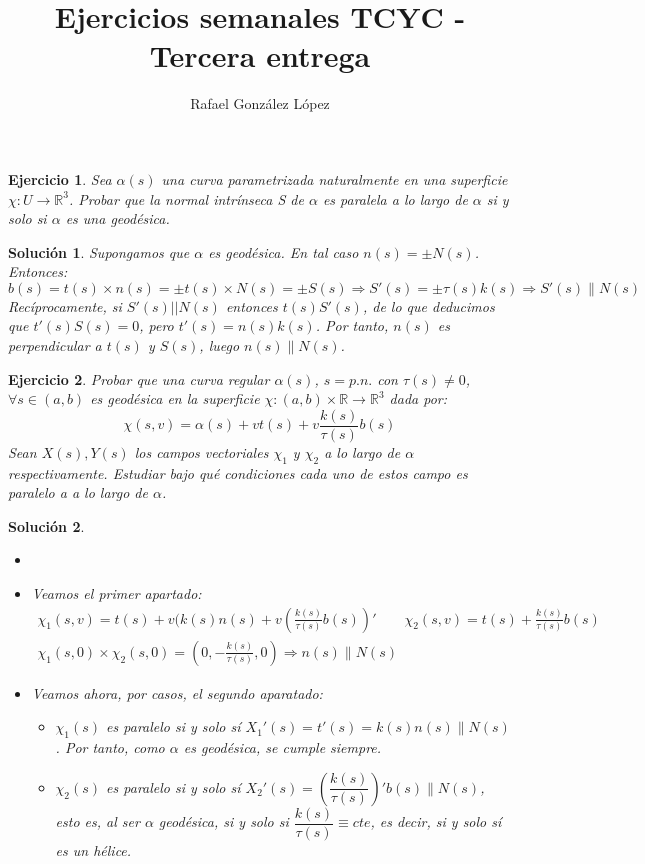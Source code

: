 \documentclass{article}
\theoremstyle{plain}
\newtheorem{exercise}{Ejercicio}
\newtheorem*{sol*}{Solución}
\newcommand{\R}{\mathbb{R}}
\newcommand{\X}{\chi}
\begin{document}
\title{Ejercicios semanales TCYC - Tercera entrega }
\author{Rafael González López}
\maketitle
\begin{exercise} Sea $\alpha(s)$ una curva parametrizada naturalmente en una superficie $\chi : U \rightarrow \R^3$. Probar
que la normal intrínseca S de $\alpha$ es paralela a lo largo de $\alpha$ si y solo si $\alpha$ es una geodésica.
\end{exercise}
\begin{sol*}
Supongamos que $\alpha$ es geodésica. En tal caso $n(s)=\pm N(s)$. Entonces:
\[
b(s) = t(s)\times n(s)= \pm t(s)\times N(s) = \pm S(s) \Rightarrow S'(s) = \pm \tau(s)k(s) \Rightarrow S'(s) \parallel N(s)
\]
Recíprocamente, si $S'(s)||N(s)$ entonces $t(s)S'(s)$, de lo que deducimos que $t'(s)S(s)=0$, pero $t'(s) = n(s)k(s)$. Por tanto, $n(s)$ es perpendicular a $t(s)$ y $S(s)$, luego $n(s)\parallel N(s)$.
\end{sol*}


\newpage
\begin{exercise}Probar que una curva regular $\alpha(s)$, $s=p.n.$ con $\tau(s)\neq 0$, $\forall s\in (a,b)$ es geodésica en la superficie $\X:(a,b)\times\R \rightarrow\R^3$ dada por:
\[
\X(s,v)=\alpha(s)+v t(s) + v\frac{k(s)}{\tau(s)}b(s)
\]
Sean $X(s),Y(s)$ los campos vectoriales $\X_1$ y $\X_2$ a lo largo de $\alpha$ respectivamente. Estudiar bajo qué condiciones cada uno de estos campo es paralelo a a lo largo de $\alpha$.
\end{exercise}
\begin{sol*}
\begin{itemize}
\item[]
\item Veamos el primer apartado:
\begin{gather*}
\chi_1(s,v) = t(s) +v(k(s)n(s)+v\left(\frac{k(s)}{\tau(s)}b(s)\right)' \qquad \chi_2(s,v) = t(s)+\frac{k(s)}{\tau(s)}b(s)\\
\X_1(s,0)\times\X_2(s,0) = \left(0,-\frac{k(s)}{\tau(s)},0\right) \Rightarrow n(s) \parallel N(s)
\end{gather*}
\item Veamos ahora, por casos, el segundo aparatado:
\begin{itemize}
\item $\chi_1(s)$ es paralelo si y solo sí $X_1'(s) = t'(s) = k(s)n(s) \parallel N(s)$. Por tanto, como $\alpha$ es geodésica, se cumple siempre.
\item $\chi_2(s)$ es paralelo si y solo sí $X_2'(s) = \left(\dfrac{k(s)}{\tau(s)}\right)'b(s)\parallel N(s)$, esto es, al ser $\alpha$ geodésica, si y solo si $\dfrac{k(s)}{\tau(s)}\equiv cte$, es decir, si y solo sí es un hélice.
\end{itemize}
\end{itemize}
\end{sol*}
\end{document}
